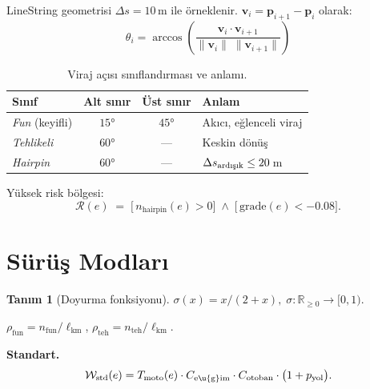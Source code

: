 \documentclass[11pt,a4paper]{article}
\newcommand{\WW}{\mathcal{W}}
\theoremstyle{definition}
\newtheorem{definition}{Tan{\i}m}[section]
\begin{document}
LineString geometrisi $\Delta s = 10$\,m ile \"orneklenir.
$\mathbf{v}_i = \mathbf{p}_{i+1}-\mathbf{p}_i$ olarak:
\begin{equation}\label{eq:angle}
  \theta_i
  = \arccos\!\left(
    \frac{\mathbf{v}_i \cdot \mathbf{v}_{i+1}}
         {\|\mathbf{v}_i\|\;\|\mathbf{v}_{i+1}\|}
  \right)
\end{equation}

\begin{table}[H]
\centering
\caption{Viraj a\c{c}{\i}s{\i} s{\i}n{\i}fland{\i}rmas{\i} ve anlam{\i}.}
\label{tab:angle-class}
\renewcommand{\arraystretch}{1.3}
\begin{tabular}{lccl}
\toprule
\textbf{S{\i}n{\i}f} & \textbf{Alt s{\i}n{\i}r} & \textbf{\"Ust s{\i}n{\i}r}
  & \textbf{Anlam} \\
\midrule
\rowcolor{passbg}
\emph{Fun} (keyifli) & $15°$ & $45°$ & Ak{\i}c{\i}, e\u{g}lenceli viraj \\
\emph{Tehlikeli}      & $60°$ & --- & Keskin d\"on\"u\c{s} \\
\rowcolor{failbg}
\emph{Hairpin}         & $60°$ & --- & $\Delta s_{\text{ard{\i}\c{s}{\i}k}} \le 20$\,m \\
\bottomrule
\end{tabular}
\end{table}

\noindent Y\"uksek risk b\"olgesi:
\begin{equation}\label{eq:highrisk}
  \mathcal{R}(e)
  \;=\;
  \bigl[\,n_{\text{hairpin}}(e)>0\bigr]
  \;\wedge\;
  \bigl[\,\text{grade}(e) < -0.08\bigr].
\end{equation}

\section{S\"ur\"u\c{s} Modlar{\i}}\label{sec:modes}

\begin{definition}[Doyurma fonksiyonu]\label{def:sat}
$\sigma(x) = x/(2+x),\;\sigma:\mathbb{R}_{\ge 0}\to [0,1).$
\end{definition}

\noindent
$\rho_{\text{fun}}=n_{\text{fun}}/\ell_{\text{km}}$,\;
$\rho_{\text{teh}}=n_{\text{teh}}/\ell_{\text{km}}$.

\smallskip\noindent\textbf{Standart.}
\begin{equation}\label{eq:standart}
  \WW_{\text{std}}(e) = T_{\mathrm{moto}}(e)
    \cdot C_{\mathrm{e\u{g}im}}
    \cdot C_{\mathrm{otoban}}
    \cdot \bigl(1 + p_{\text{yol}}\bigr).
\end{equation}
\end{document}
